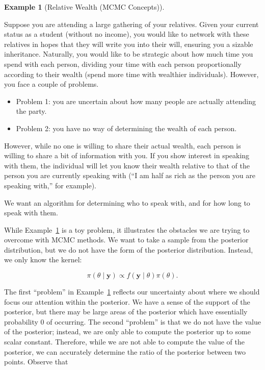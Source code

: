 \documentclass[
  letterpaper,
  DIV=11,
  numbers=noendperiod]{scrreprt}
\providecommand{\tightlist}{%
  \setlength{\itemsep}{0pt}\setlength{\parskip}{0pt}}\usepackage{longtable,booktabs,array}
\theoremstyle{definition}
\newtheorem{example}{Example}[chapter]
\theoremstyle{definition}
\theoremstyle{plain}
\theoremstyle{remark}
\begin{document}
\begin{example}[Relative Wealth (MCMC
Concepts)]\protect\hypertarget{exm-mcmc-concepts}{}\label{exm-mcmc-concepts}

Suppose you are attending a large gathering of your relatives. Given
your current status as a student (without no income), you would like to
network with these relatives in hopes that they will write you into
their will, ensuring you a sizable inheritance. Naturally, you would
like to be strategic about how much time you spend with each person,
dividing your time with each person proportionally according to their
wealth (spend more time with wealthier individuals). However, you face a
couple of problems.

\begin{itemize}
\tightlist
\item
  Problem 1: you are uncertain about how many people are actually
  attending the party.\\
\item
  Problem 2: you have no way of determining the wealth of each person.
\end{itemize}

However, while no one is willing to share their actual wealth, each
person is willing to share a bit of information with you. If you show
interest in speaking with them, the individual will let you know their
wealth relative to that of the person you are currently speaking with
(``I am half as rich as the person you are speaking with,'' for
example).

We want an algorithm for determining who to speak with, and for how long
to speak with them.

\end{example}

While Example~\ref{exm-mcmc-concepts} is a toy problem, it illustrates
the obstacles we are trying to overcome with MCMC methods. We want to
take a sample from the posterior distribution, but we do not have the
form of the posterior distribution. Instead, we only know the kernel:

\[\pi(\theta \mid \mathbf{y}) \propto f(\mathbf{y} \mid \theta) \pi(\theta).\]

The first ``problem'' in Example~\ref{exm-mcmc-concepts} reflects our
uncertainty about where we should focus our attention within the
posterior. We have a sense of the support of the posterior, but there
may be large areas of the posterior which have essentially probability 0
of occurring. The second ``problem'' is that we do not have the value of
the posterior; instead, we are only able to compute the posterior up to
some scalar constant. Therefore, while we are not able to compute the
value of the posterior, we can accurately determine the ratio of the
posterior between two points. Observe that
\end{document}
